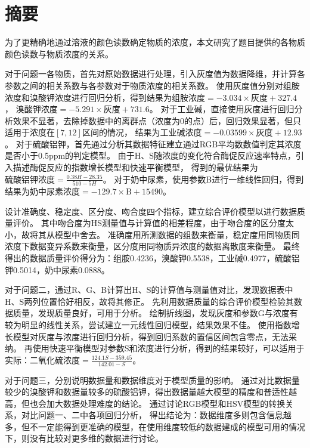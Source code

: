\section{摘要}

为了更精确地通过溶液的颜色读数确定物质的浓度，本文研究了题目提供的各物质颜色读数与物质浓度的关系。

对于问题一各物质，首先对原始数据进行处理，引入灰度值为数据降维，并计算各参数之间的相关系数与各参数对于物质浓度的相关系数。
使用灰度值分别对组胺浓度和溴酸钾浓度进行回归分析，得到结果为$\text{组胺浓度}=-3.034\times \text{灰度}+327.4$，
$\text{溴酸钾浓度}=-5.291\times \text{灰度}+731.6$。
对于工业碱，直接使用灰度进行回归分析效果不显著，去除掉数据中的离群点（浓度为0的点）后，回归效果显著，但只适用于浓度在$[7,12]$区间的情况，
结果为$\text{工业碱浓度}=-0.03599\times \text{灰度}+12.93$。
对于硫酸铝钾，首先通过分析其数据特征建立通过RGB平均数数值判定其浓度是否小于0.5ppm的判定模型。
由于H、S随浓度的变化符合酶促反应速率特点，引入描述酶促反应的指数增长模型和快速平衡模型，
得到的最优结果为$\text{硫酸铝钾浓度}=\frac{0.38H-28.35}{510-5H}$。
对于奶中尿素，使用参数B进行一维线性回归，得到结果为$\text{奶中尿素浓度}=-129.7\times \text{B}+15490$。

设计准确度、稳定度、区分度、吻合度四个指标，建立综合评价模型以进行数据质量评价。
其中吻合度为HS测量值与计算值的相差程度，由于吻合度的区分度太小，故将其从模型中舍去。
准确度用所测数据的组数来衡量，稳定度用同物质同浓度下数据变异系数来衡量，区分度用同物质异浓度的数据离散度来衡量。
最终得出的数据质量评价得分为：组胺0.4236，溴酸钾0.5538，工业碱0.4977，硫酸铝钾0.5014，奶中尿素0.0888。

对于问题二，通过R、G、B计算出H、S的计算值与测量值对比，发现数据表中H、S两列位置恰好相反，故将其修正。
先利用数据质量的综合评价模型检验其数据质量，发现质量良好，可用于分析。
绘制折线图，发现灰度和参数G与浓度有较为明显的线性关系，尝试建立一元线性回归模型，结果效果不佳。
使用指数增长模型对灰度与浓度进行回归分析，得到回归系数的置信区间包含零点，无法采纳。
再使用快速平衡模型对参数S和浓度进行分析，得到的结果较好，可以适用于实际：$\text{二氧化硫浓度}=\frac{124.1S-359.45}{142.01-S}$。

对于问题三，分别说明数据量和数据维度对于模型质量的影响。
通过对比数据量较少的溴酸钾和数据量较多的硫酸铝钾，得出数据量越大模型的精度和普适性越高，但也会加大数据处理难度的结论。
通过讨论RGB模型和HSV模型的转换关系，对比问题一、二中各项回归分析，
得出结论为：数据维度多则包含信息越多，但不一定能得到更准确的模型，在使用维度较低的数据建成的模型可用的情况下，则没有比较对更多维的数据进行讨论。